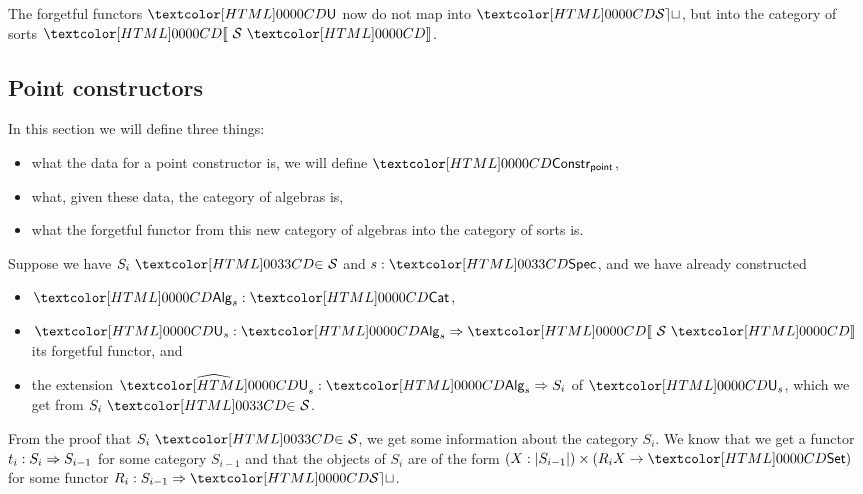 The forgetful functors $\Und$ now do not map into $\SET$, but into the
category of sorts $\SortCat{\Ss}$.

\subsection{Point constructors}
\label{point-constructors}

In this section we will define three things:
%
\begin{itemize}
\item what the data for a point constructor is, \ie we will define $\Constr_{\ident{point}}$,
\item what, given these data, the category of algebras is,
\item what the forgetful functor from this new category of algebras
  into the category of sorts is.
\end{itemize}
%
Suppose we have $\sortsin{S_i}{\Ss}$ and $s : \specty$, and we have
already constructed
%
\begin{itemize}
\item $\Alg_s : \Cat$,
\item $\Und_s : \Func{\Alg_s}{\SortCat{\Ss}}$ its forgetful functor, and
\item the extension $\extendfunc{\Und}_s : \Func{\Alg_s}{S_i}$ of $\Und_s$, which we
  get from $\sortsin{S_i}{\Ss}$.
\end{itemize}
%
From the proof that $\sortsin{S_i}{\Ss}$, we get some information
about the category $S_i$. We know that we get a functor
$t_i : S_i \Rightarrow S_{i-1}$ for some category $S_{i-1}$ and that the
objects of $S_i$ are of the form
$(X : | S_{i-1} |) \times (R_i X \to \Set)$ for some functor
$R_i : \Func{S_{i-1}}{\SET}$.

